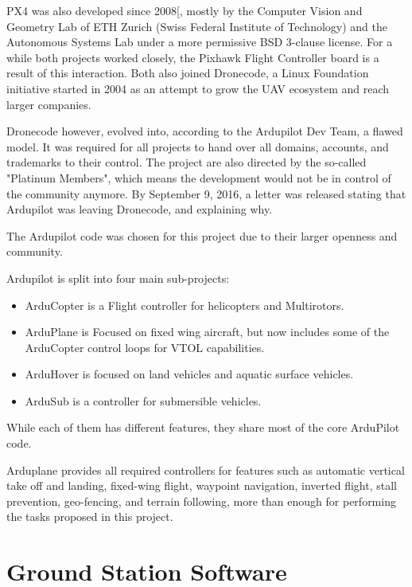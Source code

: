 PX4 was also developed since 2008[\cite{waybackmachine}, mostly by the Computer Vision and Geometry Lab of ETH Zurich (Swiss Federal Institute of Technology)\cite{computervision} and the Autonomous Systems Lab\cite{autonomouslab} under a more permissive BSD 3-clause license\cite{bsd}.
%
For a while both projects worked closely, the Pixhawk Flight Controller board is a result of this interaction.
%
Both also joined Dronecode\cite{dronecode}, a Linux Foundation\cite{linuxfoundation} initiative started in 2004 as an attempt to grow the UAV ecosystem and reach larger companies.
%

Dronecode however, evolved into, according to the Ardupilot Dev Team, a flawed model.
%
It was required for all projects to hand over all domains, accounts, and trademarks to their control.
%
The project are also directed by the so-called "Platinum Members", which means the development would not be in control of the community anymore.
%
By September 9, 2016, a letter was released stating that Ardupilot was leaving Dronecode, and explaining why\cite{letter}.

The Ardupilot code was chosen for this project due to their larger openness and community.

Ardupilot is split into four main sub-projects:
\begin{itemize}
\item ArduCopter is a Flight controller for helicopters and Multirotors.
\item ArduPlane is Focused on fixed wing aircraft, but now includes some of the ArduCopter control loops for VTOL capabilities.
\item ArduHover is focused on land vehicles and aquatic surface vehicles.
\item ArduSub is a controller for submersible vehicles.
\end{itemize}

While each of them has different features, they share most of the core ArduPilot code.

Arduplane provides all required controllers for features such as automatic vertical take off and landing, fixed-wing flight, waypoint navigation, inverted flight, stall prevention, geo-fencing, and terrain following, more than enough for performing the tasks proposed in this project.


\section{Ground Station Software}

